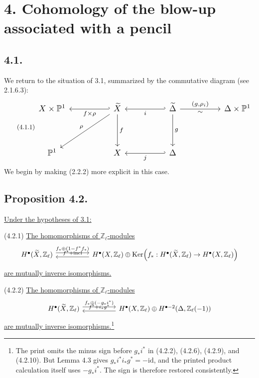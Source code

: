 \section*{4. Cohomology of the blow-up associated with a pencil}

\subsection*{4.1.}
We return to the situation of 3.1, summarized by the commutative diagram
(see 2.1.6.3):
\begin{equation}\tag{4.1.1}
\resizebox{\textwidth}{!}{%
\begin{tikzcd}[ampersand replacement=\&,row sep=huge,column sep=huge]
X\times\mathbb P^1
  \& \widetilde X
      \arrow[l,hook',"f\times\rho"]
      \arrow[d,"f"]
      \arrow[dl,"\rho"']
  \& \widetilde\Delta
      \arrow[l,hook',"i"]
      \arrow[d,"g"]
      \arrow[r,"{(g,\rho_i)}","\sim"']
  \& \Delta\times\mathbb P^1 \\
\mathbb P^1 \& X \& \Delta\arrow[l,hook',"j"] \& {}
\end{tikzcd}}
\end{equation}
We begin by making (2.2.2) more explicit in this case.

\subsection*{Proposition 4.2.}
\underline{Under the hypotheses of 3.1:}

\smallskip
\noindent
\textup{(4.2.1)} \underline{The homomorphisms of $\mathbb Z_\ell$-modules}
\[
\begin{tikzcd}[column sep=huge]
H^\bullet(\widetilde X,\mathbb Z_\ell)
  \arrow[r,shift left=.7ex,"f_*\oplus(1-f^*f_*)"]
& H^\bullet(X,\mathbb Z_\ell)\oplus
   \operatorname{Ker}\!\left(f_*:H^\bullet(\widetilde X,\mathbb Z_\ell)
       \to H^\bullet(X,\mathbb Z_\ell)\right)
  \arrow[l,shift left=.7ex,"f^*+\operatorname{incl}"']
\end{tikzcd}
\]
\underline{are mutually inverse isomorphisms.}

\smallskip
\noindent
\textup{(4.2.2)} \underline{The homomorphisms of $\mathbb Z_\ell$-modules}
\[
\begin{tikzcd}[column sep=huge]
H^\bullet(\widetilde X,\mathbb Z_\ell)
  \arrow[r,shift left=.7ex,"f_*\oplus(-g_*i^*)"]
& H^\bullet(X,\mathbb Z_\ell)\oplus
   H^{\bullet-2}(\Delta,\mathbb Z_\ell(-1))
  \arrow[l,shift left=.7ex,"f^*+i_*g^*"']
\end{tikzcd}
\]
\underline{are mutually inverse isomorphisms.}\footnote{The print omits
the minus sign before $g_*i^*$ in (4.2.2), (4.2.6), (4.2.9), and
(4.2.10).  But Lemma 4.3 gives
$g_*i^*i_*g^*=-\mathrm{id}$, and the printed product calculation itself
uses $-g_*i^*$.  The sign is therefore restored consistently.}

